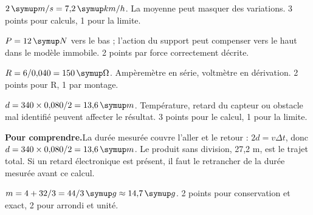 \par\noindent\begin{minipage}{\linewidth}
$2\unite{m/s}=7{,}2\unite{km/h}$. La moyenne peut masquer des variations. 3 points pour calculs, 1 pour la limite.\par
\end{minipage}\par
\par\noindent\begin{minipage}{\linewidth}
$P=12\unite N$ vers le bas ; l’action du support peut compenser vers le haut dans le modèle immobile. 2 points par force correctement décrite.\par
{}
\end{minipage}\par
\par\noindent\begin{minipage}{\linewidth}
$R=6/0{,}040=150\unite\Omega$. Ampèremètre en série, voltmètre en dérivation. 2 points pour R, 1 par montage.\par
{}
\end{minipage}\par
\par\noindent\begin{minipage}{\linewidth}
$d=340\times0{,}080/2=13{,}6\unite m$. Température, retard du capteur ou obstacle mal identifié peuvent affecter le résultat. 3 points pour le calcul, 1 pour la limite.\par
\smallskip\textbf{Pour comprendre.}\enspace La durée mesurée couvre l’aller et le retour : $2d=v\Delta t$, donc $d=340\times0{,}080/2=13{,}6\unite m$. Le produit sans division, 27,2 m, est le trajet total. Si un retard électronique est présent, il faut le retrancher de la durée mesurée avant ce calcul.\par
{}
\end{minipage}\par
{}
\label{cor-E2}
\par\noindent\begin{minipage}{\linewidth}
$m=4+32/3=44/3\unite g\approx14{,}7\unite g$. 2 points pour conservation et exact, 2 pour arrondi et unité.\par
\end{minipage}\par
